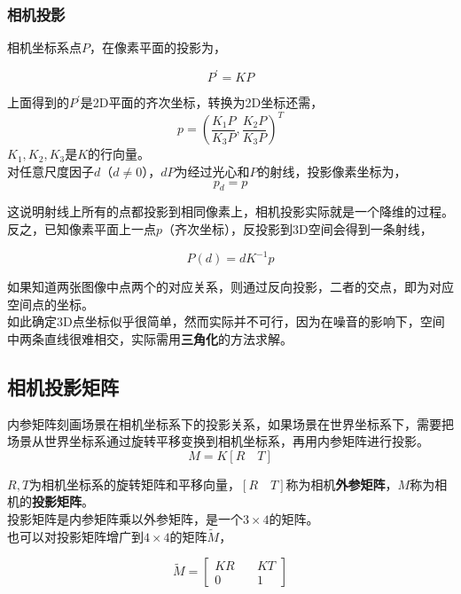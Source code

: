 \subsubsection*{相机投影}
	相机坐标系点$P$，在像素平面的投影为，

	$$
		P^{\prime}  = KP
	$$

	上面得到的$P^{\prime}$是2D平面的齐次坐标，转换为2D坐标还需，
	$$
		p = \left(\frac{K_1P}{K_3P}, \frac{K_2P}{K_3P}\right)^T
	$$
	$K_1,K_2,K_3$是$K$的行向量。\\

	对任意尺度因子$d$（$d\neq 0$），$dP$为经过光心和$P$的射线，投影像素坐标为，
	$$
		p_d = p
	$$

	这说明射线上所有的点都投影到相同像素上，相机投影实际就是一个降维的过程。\\

	反之，已知像素平面上一点$p$（齐次坐标），反投影到3D空间会得到一条射线，

	\begin{equation}
		P(d) = dK^{-1}p \label{inverse_proj}
	\end{equation}

	如果知道两张图像中点两个的对应关系，则通过反向投影，二者的交点，即为对应空间点的坐标。\\

	如此确定3D点坐标似乎很简单，然而实际并不可行，因为在噪音的影响下，空间中两条直线很难相交，实际需用\textbf{三角化}的方法求解。

\subsection{相机投影矩阵}
	内参矩阵刻画场景在相机坐标系下的投影关系，如果场景在世界坐标系下，需要把场景从世界坐标系通过旋转平移变换到相机坐标系，再用内参矩阵进行投影。
	$$
		M = K\left[R\quad T\right]
	$$

	$R,T$为相机坐标系的旋转矩阵和平移向量，$\left[R\quad T\right]$称为相机\textbf{外参矩阵}，$M$称为相机的\textbf{投影矩阵}。\\

	投影矩阵是内参矩阵乘以外参矩阵，是一个$3\times 4$的矩阵。\\

	也可以对投影矩阵增广到$4\times 4$的矩阵$\tilde{M}$，

	$$
		\tilde{M} = \begin{bmatrix}
			KR\quad& KT\\
			0\quad& 1
		\end{bmatrix}
	$$

